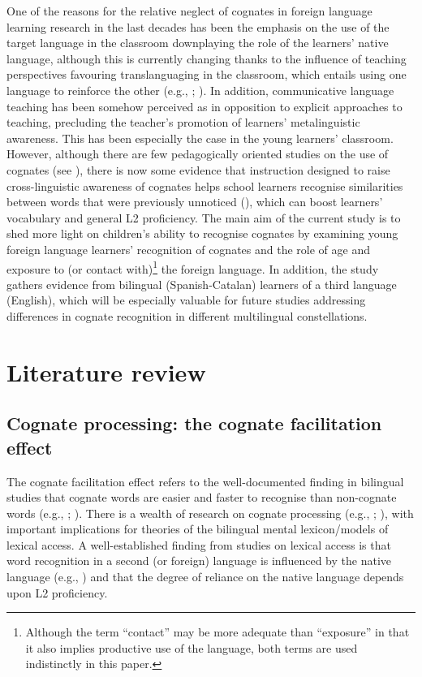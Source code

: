 \documentclass[output=paper,modfonts,nonflat,newtxmath]{langsci/langscibook}
\begin{document}
One of the reasons for the relative neglect of cognates in foreign language learning research in the last decades has been the emphasis on the use of the target language in the classroom downplaying the role of the learners’ native language, although this is currently changing thanks to the influence of teaching perspectives favouring translanguaging in the classroom, which entails using one language to reinforce the other (e.g., \citealt{Williams2002}; \citealt{GarcíaLin2016}). In addition, communicative language teaching has been somehow perceived as in opposition to explicit approaches to teaching, precluding the teacher’s promotion of learners’ metalinguistic awareness. This has been especially the case in the young learners’ classroom. However, although there are few pedagogically oriented studies on the use of cognates (see \citealt{Otwinowska2016}), there is now some evidence that instruction designed to raise cross-linguistic awareness of cognates helps school learners recognise similarities between words that were previously unnoticed (\citealt{WhiteHorst2012}), which can boost learners’ vocabulary and general L2 proficiency. The main aim of the current study is to shed more light on children’s ability to recognise cognates by examining young foreign language learners’ recognition of cognates and the role of age and exposure to (or contact with)\footnote{Although the term “contact” may be more adequate than “exposure” in that it also implies productive use of the language, both terms are used indistinctly in this paper.} the foreign language. In addition, the study gathers evidence from bilingual (Spanish-Catalan) learners of a third language (English), which will be especially valuable for future studies addressing differences in cognate recognition in different multilingual constellations.

\section{Literature review}


\subsection{Cognate processing: the cognate facilitation effect}

The cognate facilitation effect refers to the well-documented finding in bilingual studies that cognate words are easier and faster to recognise than non-cognate words (e.g., \citealt{CaramazzaBrones1979}; \citealt{CostaEtAl2000}). There is a wealth of research on cognate processing (e.g., \citealt{VanHellDeGroot1998}; \citealt{DijkstraEtAl1999}), with important implications for theories of the bilingual mental lexicon/models of lexical access. A well-established finding from studies on lexical access is that word recognition in a second (or foreign) language is influenced by the native language (e.g., \citealt{KrollDijkstra2002}) and that the degree of reliance on the native language depends upon L2 proficiency.
\end{document}
